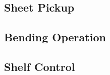 \subsection{Sheet Pickup}
\label{subsec:sheet-pickup}


\subsection{Bending Operation}
\label{subsec:bending-operation}


\subsection{Shelf Control}
\label{subsec:shelf-control}



